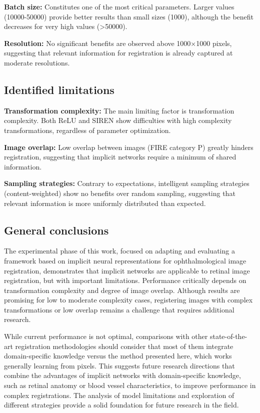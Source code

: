 \textbf{Batch size:} Constitutes one of the most critical parameters. Larger values (10000-50000) provide better results than small sizes (1000), although the benefit decreases for very high values (>50000).

\textbf{Resolution:} No significant benefits are observed above 1000×1000 pixels, suggesting that relevant information for registration is already captured at moderate resolutions.

\subsection{Identified limitations}
\label{subsec:Limitacións identificadas}

\textbf{Transformation complexity:} The main limiting factor is transformation complexity. Both ReLU and SIREN show difficulties with high complexity transformations, regardless of parameter optimization.

\textbf{Image overlap:} Low overlap between images (FIRE category P) greatly hinders registration, suggesting that implicit networks require a minimum of shared information.

\textbf{Sampling strategies:} Contrary to expectations, intelligent sampling strategies (content-weighted) show no benefits over random sampling, suggesting that relevant information is more uniformly distributed than expected.

\subsection{General conclusions}
\label{subsec:Conclusións xerais}

The experimental phase of this work, focused on adapting and evaluating a framework based on implicit neural representations for ophthalmological image registration,
demonstrates that implicit networks are applicable to retinal image registration, but with important limitations.
Performance critically depends on transformation complexity and degree of image overlap. Although results are promising for low to moderate complexity cases, registering images with complex transformations or low overlap remains a challenge that requires additional research.

While current performance is not optimal, comparisons with other state-of-the-art registration methodologies should consider that most of them integrate domain-specific knowledge versus the method presented here, which works generally learning from pixels.
This suggests future research directions that combine the advantages of implicit networks with domain-specific knowledge, such as retinal anatomy or blood vessel characteristics, to improve performance in complex registrations.
The analysis of model limitations and exploration of different strategies provide a solid foundation for future research in the field.